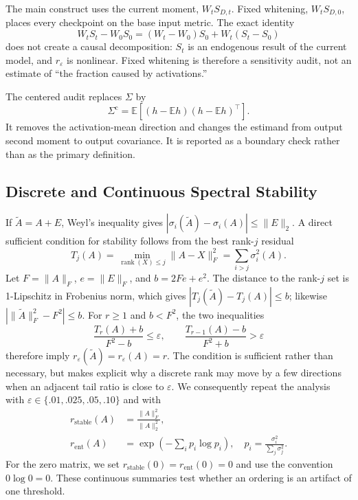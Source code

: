 \documentclass[letterpaper]{article} %
\begin{document}
The main construct uses the current moment, $W_tS_{D,t}$. Fixed whitening,
$W_tS_{D,0}$, places every checkpoint on the base input metric. The exact identity
\begin{equation}
W_tS_t-W_0S_0
=(W_t-W_0)S_0+W_t(S_t-S_0)
\label{eq:supp-fixed}
\end{equation}
does not create a causal decomposition: $S_t$ is an endogenous result of the current
model, and $r_\varepsilon$ is nonlinear. Fixed whitening is therefore a sensitivity
audit, not an estimate of ``the fraction caused by activations.''

The centered audit replaces $\Sigma$ by
\begin{equation}
\Sigma^{\mathrm c}
=\mathbb E[(h-\mathbb E h)(h-\mathbb E h)^\top].
\end{equation}
It removes the activation-mean direction and changes the estimand from output second
moment to output covariance. It is reported as a boundary check rather than as the
primary definition.

\subsection{Discrete and Continuous Spectral Stability}

If $\widetilde A=A+E$, Weyl's inequality gives
$|\sigma_i(\widetilde A)-\sigma_i(A)|\le\|E\|_2$. A direct sufficient
condition for stability follows from the best rank-$j$ residual
\begin{equation}
T_j(A)=\min_{\operatorname{rank}(X)\leq j}\|A-X\|_F^2
=\sum_{i>j}\sigma_i^2(A).
\end{equation}
Let $F=\|A\|_F$, $e=\|E\|_F$, and $b=2Fe+e^2$. The distance to the
rank-$j$ set is 1-Lipschitz in Frobenius norm, which gives
$|T_j(\widetilde A)-T_j(A)|\leq b$; likewise
$|\|\widetilde A\|_F^2-F^2|\leq b$. For $r\geq1$ and $b<F^2$, the two
inequalities
\begin{equation}
\frac{T_r(A)+b}{F^2-b}\leq\varepsilon,\qquad
\frac{T_{r-1}(A)-b}{F^2+b}>\varepsilon
\label{eq:supp-rank-stability}
\end{equation}
therefore imply $r_\varepsilon(\widetilde A)=r_\varepsilon(A)=r$.
The condition is sufficient rather than necessary, but makes explicit why a discrete
rank may move by a few directions when an adjacent tail ratio is close to
$\varepsilon$. We consequently repeat the analysis with
$\varepsilon\in\{.01,.025,.05,.10\}$ and with
\begin{align}
r_{\mathrm{stable}}(A)&=\frac{\|A\|_F^2}{\|A\|_2^2},\\
r_{\mathrm{ent}}(A)&=\exp\left(-\sum_i p_i\log p_i\right),
\quad p_i=\frac{\sigma_i^2}{\sum_j\sigma_j^2}.
\end{align}
For the zero matrix, we set
$r_{\mathrm{stable}}(0)=r_{\mathrm{ent}}(0)=0$ and use the convention
$0\log 0=0$.
These continuous summaries test whether an ordering is an artifact of one threshold.
\end{document}
